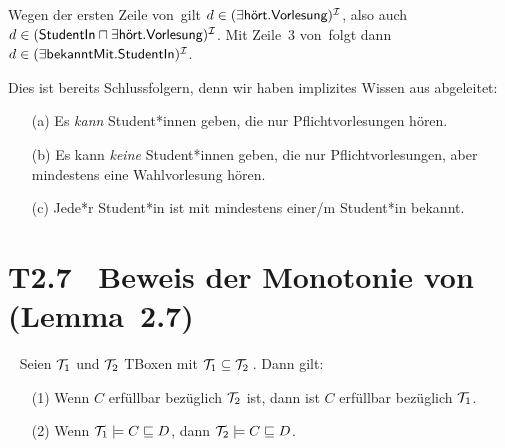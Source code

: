 \documentclass[fontsize=11pt, twoside=false, numbers=autoenddot]{scrbook}
\begin{document}
\begin{enumerate}
    Wegen der ersten Zeile von~\Tmc gilt
    $d \in (\exists\textsf{hört}.\textsf{Vorlesung})^\mathcal{I}$,
    also auch $d \in (\textsf{StudentIn} \sqcap \exists\textsf{hört}.\textsf{Vorlesung})^\mathcal{I}$.
    Mit Zeile~3 von~\Tmc folgt dann $d \in (\exists\textsf{bekanntMit}.\textsf{StudentIn})^\mathcal{I}$.    
\end{enumerate}
%
Dies ist bereits Schlussfolgern, denn wir haben implizites Wissen aus \Tmc abgeleitet:
%
\begin{enumerate}
  \item[(a)]
    Es \emph{kann} Student*innen geben, die nur Pflichtvorlesungen hören.
  \item[(b)]
    Es kann \emph{keine} Student*innen geben, die nur Pflichtvorlesungen,
    aber mindestens eine Wahlvorlesung hören.
  \item[(c)]
    Jede*r Student*in ist mit mindestens einer/m Student*in bekannt.
\end{enumerate}

\section*{T2.7~ Beweis der Monotonie von {\boldmath \ALC} (Lemma~2.7)}

~
Seien $\mathcal{T}_1$ und $\mathcal{T}_2$ TBoxen mit $\mathcal{T}_1 \subseteq \mathcal{T}_2$\,. Dann gilt:
%
\begin{enumerate}
  \item[(1)]
    Wenn $C$ erfüllbar bezüglich $\mathcal{T}_2$ ist, dann ist $C$ erfüllbar bezüglich $\mathcal{T}_1$.
  \item[(2)]
    Wenn $\mathcal{T}_1 \models C \sqsubseteq D$, dann $\mathcal{T}_2 \models C \sqsubseteq D$.
\end{enumerate}
\end{document}
